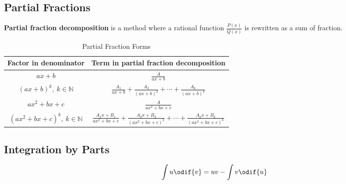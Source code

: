 \documentclass{article}
\begin{document}
\subsection{Partial Fractions}
\begin{definition}
    \textbf{Partial fraction decomposition} is a \linebreak method where a rational function \(\displaystyle \frac{P(x)}{Q(x)}\) is rewritten as a sum of fraction.
\end{definition}
\begin{table}[H]
    \renewcommand*{\arraystretch}{1.5}
    \centering
    \begin{tabular}{c c}
        \toprule
        \textbf{Factor in denominator}                    & \textbf{Term in partial fraction decomposition}                                                                                                   \\
        \midrule
        \(ax+b\)                                          & \(\displaystyle \frac{A}{ax+b}\)                                                                                                                  \\[10pt]
        \(\left(ax+b\right)^k, \: k \in \mathbb{N}\)      & \(\displaystyle \frac{A_1}{ax+b} + \frac{A_2}{\left( ax+b \right)^2} + \cdots + \frac{A_k}{\left( ax+b \right)^k}\)                               \\[10pt]
        \(ax^2+bx+c\)                                     & \(\displaystyle \frac{A}{ax^2+bx+c}\)                                                                                                             \\[10pt]
        \(\left(ax^2+bx+c\right)^k, \: k \in \mathbb{N}\) & \(\displaystyle \frac{A_1x+B_1}{ax^2+bx+c} + \frac{A_2x+B_2}{\left( ax^2+bx+c \right)^2} + \cdots + \frac{A_k x+B_k}{\left( ax^2+bx+c \right)^k}\) \\[10pt]
        \bottomrule
    \end{tabular}
    \caption{Partial Fraction Forms}
\end{table}
\subsection{Integration by Parts}
\begin{theorem}
    \begin{equation*}
        \int u \odif{v} = uv - \int v \odif{u}
    \end{equation*}
\end{theorem}
\end{document}
